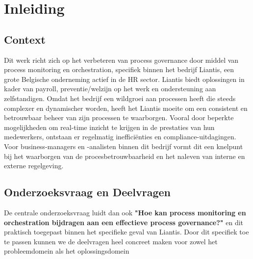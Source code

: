 
\section{Inleiding}%
\label{sec:inleiding}

\subsection{Context}

Dit werk richt zich op het verbeteren van process governance door middel van process monitoring en orchestration, specifiek binnen het bedrijf Liantis, een grote Belgische onderneming actief in de HR sector. Liantis biedt oplossingen in kader van payroll, preventie/welzijn op het werk en ondersteuning aan zelfstandigen. Omdat het bedrijf een wildgroei aan processen heeft die steeds complexer en dynamischer worden, heeft het Liantis moeite om een consistent en betrouwbaar beheer van zijn processen te waarborgen. Vooral door beperkte mogelijkheden om real-time inzicht te krijgen in de prestaties van hun medewerkers, ontstaan er regelmatig inefficiënties en compliance-uitdagingen. Voor business-managers en -analisten binnen dit bedrijf vormt dit een knelpunt bij het waarborgen van de procesbetrouwbaarheid en het naleven van interne en externe regelgeving. 

\subsection{Onderzoeksvraag en Deelvragen}
De centrale onderzoeksvraag luidt dan ook \textbf{"Hoe kan process monitoring en orchestration bijdragen aan een effectieve process governance?"} en dit praktisch toegepast binnen het specifieke geval van Liantis. Door dit specifiek toe te passen kunnen we de deelvragen heel concreet maken voor zowel het probleemdomein als het oplossingsdomein

